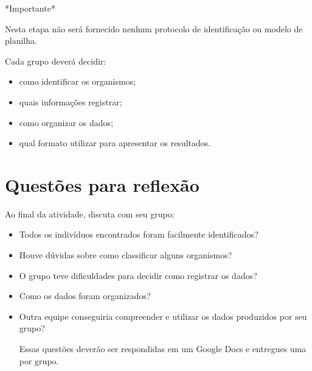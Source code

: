 \documentclass[
  letterpaper,
  DIV=11,
  numbers=noendperiod]{scrartcl}
\begin{document}
*Importante*

\begin{tcolorbox}[enhanced jigsaw, arc=.35mm, bottomrule=.15mm, bottomtitle=1mm, breakable, colback=white, colbacktitle=quarto-callout-tip-color!10!white, colframe=quarto-callout-tip-color-frame, coltitle=black, left=2mm, leftrule=.75mm, opacityback=0, opacitybacktitle=0.6, rightrule=.15mm, title=\textcolor{quarto-callout-tip-color}{\faLightbulb}\hspace{0.5em}{Tip}, titlerule=0mm, toprule=.15mm, toptitle=1mm]

Nesta etapa não será fornecido nenhum protocolo de identificação ou
modelo de planilha.

Cada grupo deverá decidir:

\begin{itemize}
\item
  como identificar os organismos;
\item
  quais informações registrar;
\item
  como organizar os dados;
\item
  qual formato utilizar para apresentar os resultados.
\end{itemize}

\end{tcolorbox}

\section{Questões para reflexão}\label{questuxf5es-para-reflexuxe3o}

\begin{tcolorbox}[enhanced jigsaw, arc=.35mm, bottomrule=.15mm, bottomtitle=1mm, breakable, colback=white, colbacktitle=quarto-callout-important-color!10!white, colframe=quarto-callout-important-color-frame, coltitle=black, left=2mm, leftrule=.75mm, opacityback=0, opacitybacktitle=0.6, rightrule=.15mm, title=\textcolor{quarto-callout-important-color}{\faExclamation}\hspace{0.5em}{Important}, titlerule=0mm, toprule=.15mm, toptitle=1mm]

Ao final da atividade, discuta com seu grupo:

\begin{itemize}
\item
  Todos os indivíduos encontrados foram facilmente identificados?
\item
  Houve dúvidas sobre como classificar alguns organismos?
\item
  O grupo teve dificuldades para decidir como registrar os dados?
\item
  Como os dados foram organizados?
\item
  Outra equipe conseguiria compreender e utilizar os dados produzidos
  por seu grupo?

  Essas questões deverão ser respondidas em um Google Docs e entregues
  uma por grupo.
\end{itemize}

\end{tcolorbox}
\end{document}
